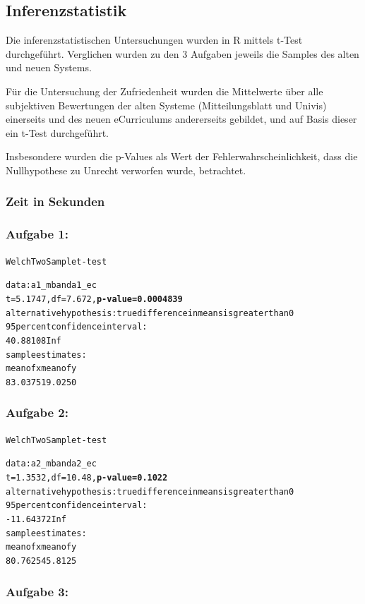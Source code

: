 \documentclass[a4paper,10pt]{scrartcl}
\begin{document}
\pagebreak

\subsection{Inferenzstatistik}

Die inferenzstatistischen Untersuchungen wurden in R mittels t-Test durchgeführt. Verglichen wurden zu den 3 Aufgaben jeweils die Samples des alten und neuen Systems.

Für die Untersuchung der Zufriedenheit wurden die Mittelwerte über alle subjektiven Bewertungen der alten Systeme (Mitteilungsblatt und Univis) einerseits und des neuen eCurriculums andererseits gebildet, und auf Basis dieser ein t-Test durchgeführt.

Insbesondere wurden die p-Values als Wert der Fehlerwahrscheinlichkeit, dass die Nullhypothese zu Unrecht verworfen wurde, betrachtet.

\subsubsection*{Zeit in Sekunden} 

\subsubsection*{Aufgabe 1:}

\begin{alltt}
Welch Two Sample t-test

data:  a1_mb and a1_ec 
t = 5.1747, df = 7.672, \textbf{p-value = 0.0004839}
alternative hypothesis: true difference in means is greater than 0 
95 percent confidence interval:
 40.88108      Inf 
sample estimates:
mean of x mean of y 
  83.0375   19.0250 
\end{alltt} 

\subsubsection*{Aufgabe 2:}

\begin{alltt}
Welch Two Sample t-test

data:  a2_mb and a2_ec 
t = 1.3532, df = 10.48, \textbf{p-value = 0.1022}
alternative hypothesis: true difference in means is greater than 0 
95 percent confidence interval:
 -11.64372       Inf 
sample estimates:
mean of x mean of y 
  80.7625   45.8125 
\end{alltt} 

\subsubsection*{Aufgabe 3:}
\end{document}
